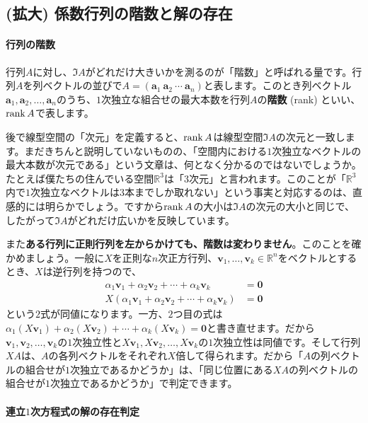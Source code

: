 \subsection{(拡大) 係数行列の階数と解の存在}

\paragraph{行列の階数}

行列$A$に対し、$\Im A$がどれだけ大きいかを測るのが「階数」と呼ばれる量です。行列$A$を列ベクトルの並びで$A = (\bm{a}_1 \ \bm{a}_2 \ \cdots \ \bm{a}_n)$と表します。このとき列ベクトル$\bm{a}_1, \bm{a}_2, \ldots, \bm{a}_n$のうち、$1$次独立な組合せの最大本数を行列$A$の\textbf{階数} (rank) といい、$\operatorname{rank} A$で表します。

後で線型空間の「次元」を定義すると、$\operatorname{rank} A$は線型空間$\Im A$の次元と一致します。まだきちんと説明していないものの、「空間内における$1$次独立なベクトルの最大本数が次元である」という文章は、何となく分かるのではないでしょうか。たとえば僕たちの住んでいる空間$\mathbb{R}^3$は「$3$次元」と言われます。このことが「$\mathbb{R}^3$内で$1$次独立なベクトルは$3$本までしか取れない」という事実と対応するのは、直感的には明らかでしょう。ですから$\operatorname{rank} A$の大小は$\Im A$の次元の大小と同じで、したがって$\Im A$がどれだけ広いかを反映しています。

また\textbf{ある行列に正則行列を左からかけても、階数は変わりません}。このことを確かめましょう。一般に$X$を正則な$n$次正方行列、$\bm{v}_1,\ldots,\bm{v}_k\in\mathbb{R}^n$をベクトルとするとき、$X$は逆行列を持つので、
\begin{align*}
\alpha_1 \bm{v}_1 + \alpha_2 \bm{v}_2 + \cdots + \alpha_k \bm{v}_k &= \bm{0} \\
X(\alpha_1 \bm{v}_1 + \alpha_2 \bm{v}_2 + \cdots + \alpha_k \bm{v}_k) &= \bm{0}
\end{align*}
という$2$式が同値になります。一方、$2$つ目の式は$\alpha_1 (X\bm{v}_1) + \alpha_2 (X\bm{v}_2) + \cdots + \alpha_k (X\bm{v}_k) = \bm{0}$と書き直せます。だから$\bm{v}_1, \bm{v}_2, \ldots, \bm{v}_k$の$1$次独立性と$X\bm{v}_1, X\bm{v}_2, \ldots, X\bm{v}_k$の$1$次独立性は同値です。そして行列$XA$は、$A$の各列ベクトルをそれぞれ$X$倍して得られます。だから「$A$の列ベクトルの組合せが$1$次独立であるかどうか」は、「同じ位置にある$XA$の列ベクトルの組合せが$1$次独立であるかどうか」で判定できます。

\paragraph{連立$1$次方程式の解の存在判定}


